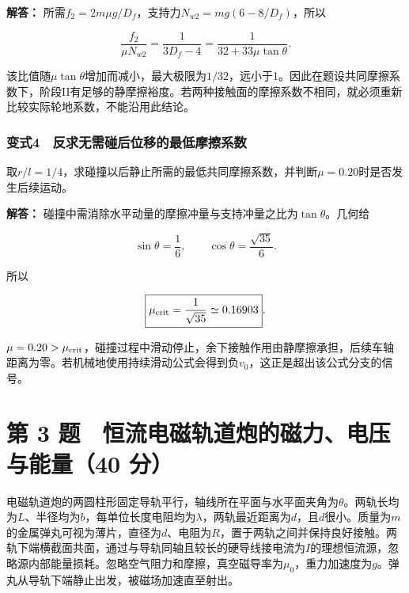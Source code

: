 \documentclass[12pt,a4paper,fontset=fandol]{ctexart}
\begin{document}
\textbf{解答：}
所需\(f_2=2m\mu g/D_f\)，支持力\(N_{w2}=mg(6-8/D_f)\)，所以

\[
\frac{f_2}{\mu N_{w2}}=\frac1{3D_f-4}
=\frac1{32+33\mu\tan\theta}.
\]

该比值随\(\mu\tan\theta\)增加而减小，最大极限为\(1/32\)，远小于1。因此在题设共同摩擦系数下，阶段II有足够的静摩擦裕度。若两种接触面的摩擦系数不相同，就必须重新比较实际轮地系数，不能沿用此结论。

\par\noindent\begin{minipage}{\linewidth}
\subsubsection{变式4　反求无需碰后位移的最低摩擦系数}\label{ux53d8ux5f0f4-ux53cdux6c42ux65e0ux9700ux78b0ux540eux4f4dux79fbux7684ux6700ux4f4eux6469ux64e6ux7cfbux6570}

取\(r/l=1/4\)，求碰撞以后静止所需的最低共同摩擦系数，并判断\(\mu=0.20\)时是否发生后续运动。

\textbf{解答：}
碰撞中需消除水平动量的摩擦冲量与支持冲量之比为\(\tan\theta\)。几何给

\[
\sin\theta=\frac16,\qquad
\cos\theta=\frac{\sqrt{35}}6.
\]

所以

\[
\boxed{\mu_{\rm crit}=\frac1{\sqrt{35}}\simeq0.16903}.
\]

\(\mu=0.20>\mu_{\rm crit}\)，碰撞过程中滑动停止，余下接触作用由静摩擦承担，后续车轴距离为零。若机械地使用持续滑动公式会得到负\(v_0\)，这正是超出该公式分支的信号。

\end{minipage}\par
\clearpage

\section{第 3 题　恒流电磁轨道炮的磁力、电压与能量（40
分）}\label{ux7b2c-3-ux9898-ux6052ux6d41ux7535ux78c1ux8f68ux9053ux70aeux7684ux78c1ux529bux7535ux538bux4e0eux80fdux91cf40-ux5206}

电磁轨道炮的两圆柱形固定导轨平行，轴线所在平面与水平面夹角为\(\theta\)。两轨长均为\(L\)、半径均为\(b\)，每单位长度电阻均为\(\lambda\)，两轨最近距离为\(d\)，且\(d\)很小。质量为\(m\)的金属弹丸可视为薄片，直径为\(d\)、电阻为\(R\)，置于两轨之间并保持良好接触。两轨下端横截面共面，通过与导轨同轴且较长的硬导线接电流为\(I\)的理想恒流源，忽略源内部能量损耗。忽略空气阻力和摩擦，真空磁导率为\(\mu_0\)，重力加速度为\(g\)。弹丸从导轨下端静止出发，被磁场加速直至射出。
\end{document}
